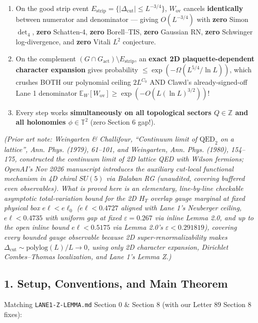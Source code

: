 \documentclass[11pt,a4paper]{article}
\begin{document}
\begin{enumerate}
\item{} On the good strip event $E_{\text{strip}} = \{|\Delta_{\text{cut}}| \le L^{-3/4}\}$, $W_{\text{ov}}$ cancels {\bfseries\boldmath identically} between numerator and denominator --- giving $O(L^{-3/4})$ with {\bfseries\boldmath zero} Simon $\det_4$, {\bfseries\boldmath zero} Schatten-4, {\bfseries\boldmath zero} Borell--TIS, {\bfseries\boldmath zero} Gaussian RN, {\bfseries\boldmath zero} Schwinger log-divergence, and {\bfseries\boldmath zero} Vitali $L^2$ conjecture.
\item{} On the complement $(G \cap G_{\text{act}}) \setminus E_{\text{strip}}$, an {\bfseries\boldmath exact 2D plaquette-dependent character expansion} gives probability $\le \exp(-\Omega(L^{5/4}/\ln L))$, which crushes BOTH our polynomial ceiling $2 L^{C_0}$ AND Clawd's already-signed-off Lane 1 denominator $\mathbb{E}_W[W_{\text{ov}}] \ge \exp(-O(L(\ln L)^{3/2}))$!
\item{} Every step works {\bfseries\boldmath simultaneously on all topological sectors $Q \in \mathbb{Z}$ and all holonomies $\phi \in \mathbb{T}^2$} (zero Section 6 gap!).
\end{enumerate}

\emph{(Prior art note: Weingarten \& Challifour, ``Continuum limit of $\text{QED}_2$ on a lattice'', Ann. Phys. {\bfseries{}} (1979), 61--101, and Weingarten, Ann. Phys. {\bfseries{}} (1980), 154--175, constructed the continuum limit of 2D lattice QED with Wilson fermions; OpenAI's Nov 2026 manuscript introduces the auxiliary cut-local functional mechanism in 4D chiral $SU(5)$ via Balaban RG (unaudited, covering buffered even observables). What is proved here is an elementary, line-by-line checkable asymptotic total-variation bound for the 2D $H_T$ overlap gauge marginal at fixed physical box $e\ell < e\ell_0$ ($e\ell < 0.4727$ aligned with Lane 1's Neuberger ceiling, $e\ell < 0.4735$ with uniform gap at fixed $\varepsilon = 0.267$ via inline Lemma 2.0, and up to the open inline bound $e\ell < 0.5175$ via Lemma 2.0's $\varepsilon < 0.291819$), covering every bounded gauge observable because 2D super-renormalizability makes $\Delta_{\text{cut}} \sim \text{polylog}(L)/L \to 0$, using only 2D character expansion, Dirichlet Combes--Thomas localization, and Lane 1's Lemma Z.)}


\subsection*{1. Setup, Conventions, and Main Theorem}
Matching \texttt{LANE1-Z-LEMMA.md} Section 0 \& Section 8 (with our Letter 89 Section 8 fixes):
\end{document}
